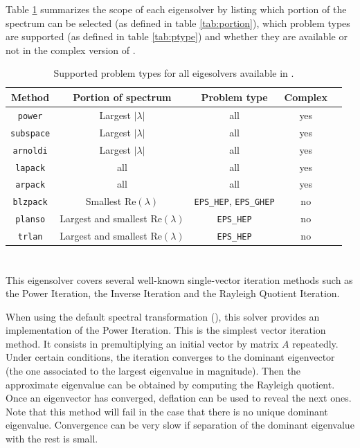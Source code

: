 	Table \ref{tab:support} summarizes the scope of each eigensolver by listing which portion of the spectrum can be selected (as defined in table \ref{tab:portion}), which problem types are supported (as defined in table \ref{tab:ptype}) and whether they are available or not in the complex version of \slepc. 
\begin{table}
\centering
\begin{tabular}{ccccc} \hline
Method   &  Portion of spectrum & Problem type & Complex \\ \hline
\texttt{power}    &  Largest $|\lambda|$ & all & yes \\ 
\texttt{subspace} &  Largest $|\lambda|$ & all & yes \\ 
\texttt{arnoldi}  &  Largest $|\lambda|$ & all & yes \\ 
\hline
\texttt{lapack}   &  all &  all & yes \\ 
\texttt{arpack}   &  all &  all & yes \\ 
\texttt{blzpack}  &  Smallest $\mathrm{Re}(\lambda)$ & \Verb!EPS_HEP!, \Verb!EPS_GHEP!  & no \\ 
\texttt{planso}   &  Largest and smallest $\mathrm{Re}(\lambda)$ & \Verb!EPS_HEP! & no \\ 
\texttt{trlan}    &  Largest and smallest $\mathrm{Re}(\lambda)$ & \Verb!EPS_HEP! & no \\ \hline
\end{tabular}
\caption{\label{tab:support}Supported problem types for all eigesolvers available in \slepc.}
\end{table}


\section{}

This eigensolver covers several well-known single-vector iteration methods such as the Power Iteration, the Inverse Iteration and the Rayleigh Quotient Iteration.

When using the default spectral transformation (), this solver provides an implementation of the Power Iteration. This is the simplest vector iteration method. It consists in premultiplying an initial vector by matrix $A$ repeatedly. Under certain conditions, the iteration converges to the dominant eigenvector (the one associated to the largest eigenvalue in magnitude). Then the approximate eigenvalue can be obtained by computing the Rayleigh quotient. Once an eigenvector has converged, deflation can be used to reveal the next ones. Note that this method will fail in the case that there is no unique dominant eigenvalue. Convergence can be very slow if separation of the dominant eigenvalue with the rest is small.

